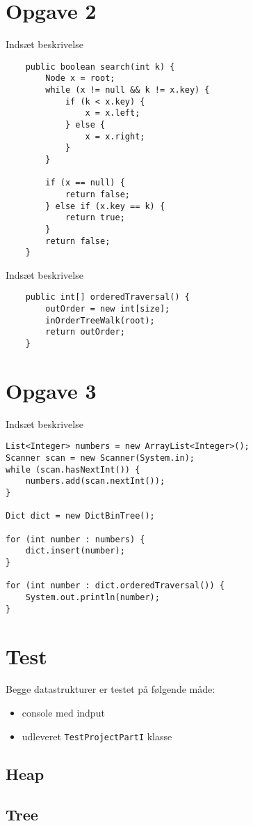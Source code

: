 \documentclass{article}
\begin{document}
\section*{Opgave 2}
Indsæt beskrivelse
\begin{lstlisting}
	public boolean search(int k) {
        Node x = root;
        while (x != null && k != x.key) {
            if (k < x.key) {
                x = x.left;
            } else {
                x = x.right;
            }
        }

        if (x == null) {
            return false;
        } else if (x.key == k) {
            return true;
        }
        return false;
    }
\end{lstlisting}
Indsæt beskrivelse
\begin{lstlisting}
	public int[] orderedTraversal() {
        outOrder = new int[size];
        inOrderTreeWalk(root);
        return outOrder;
    }
\end{lstlisting}
\newpage
\section*{Opgave 3}
Indsæt beskrivelse
\begin{lstlisting}
List<Integer> numbers = new ArrayList<Integer>();
Scanner scan = new Scanner(System.in);
while (scan.hasNextInt()) {
	numbers.add(scan.nextInt());
}

Dict dict = new DictBinTree();

for (int number : numbers) {
	dict.insert(number);
}

for (int number : dict.orderedTraversal()) {
	System.out.println(number);
}
\end{lstlisting}
\newpage
\section*{Test}
Begge datastrukturer er testet på følgende måde:
\begin{itemize}
  \item console med indput
  \item udleveret \texttt{TestProjectPartI} klasse
\end{itemize}
\subsection*{Heap}

\subsection*{Tree}
\end{document}
